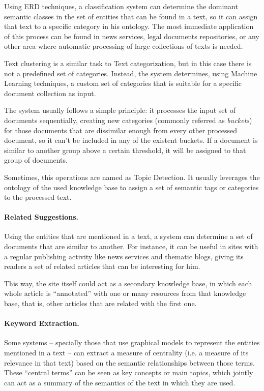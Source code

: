 Using ERD techniques, a classification system can determine the dominant semantic classes in the set of entities that can be found in a text, so it can assign that text to a specific category in his ontology. The most immediate application of this process can be found in news services, legal documents repositories, or any other area where automatic processing of large collections of texts is needed.

Text clustering is a similar task to Text categorization, but in this case there is not a predefined set of categories. Instead, the system determines, using Machine Learning techniques, a custom set of categories that is suitable for a specific document collection as input.

The system usually follows a simple principle: it processes the input set of documents sequentially, creating new categories (commonly referred as \emph{buckets}) for those documents that are dissimilar enough from every other processed document, so it can't be included in any of the existent buckets. If a document is similar to another group above a certain threshold, it will be assigned to that group of documents.

Sometimes, this operations are named as Topic Detection. It usually leverages the ontology of the used knowledge base to assign a set of semantic tags or categories to the processed text.

\paragraph{Related Suggestions.}

Using the entities that are mentioned in a text, a system can determine a set of documents that are similar to another. For instance, it can be useful in sites with a regular publishing activity like news services and thematic blogs, giving its readers a set of related articles that can be interesting for him.

This way, the site itself could act as a secondary knowledge base, in which each whole article is ``annotated'' with one or many resources from that knowledge base, that is, other articles that are related with the first one.

\paragraph{Keyword Extraction.}

Some systems -- specially those that use graphical models to represent the entities mentioned in a text -- can extract a measure of centrality (i.e. a measure of its relevance in that text) based on the semantic relationships between those terms. These ``central terms'' can be seen as key concepts or main topics, which jointly can act as a summary of the semantics of the text in which they are used.


